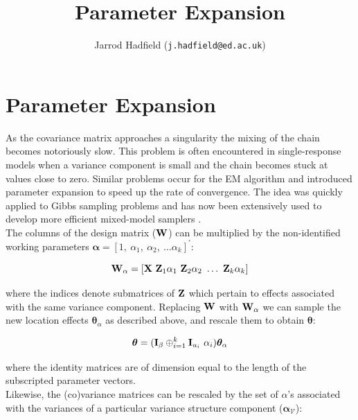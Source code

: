 \documentclass{article}
\title{Parameter Expansion}
\author{Jarrod Hadfield (\texttt{j.hadfield@ed.ac.uk})}
\begin{document}
\maketitle
\else
\chapter{Parameter Expansion}
\label{secPX}
\fi


As the covariance matrix approaches a singularity the mixing of the chain becomes notoriously slow. This problem is often encountered in single-response models when a variance component is small and the chain becomes stuck at values close to zero.  Similar problems occur for the EM algorithm and \citet{Liu.1998} introduced parameter expansion to speed up the rate of convergence. The idea was quickly applied to Gibbs sampling problems \citep{Liu.1999} and has now been extensively used to develop more efficient mixed-model samplers \citep[e.g.][]{vanDyk.2001, Gelman.2008b, Browne.2009}.\\

The columns of the design matrix (${\bf W}$) can be multiplied by the non-identified working parameters ${\bm \alpha} = \left[1,\ \alpha_{1},\ \alpha_{2},\ \dots \alpha_{k}\right]^{'}$:

\begin{equation} 
{\bf W}_{\alpha} = \left[{\bf X}\ {\bf Z}_{1}\alpha_{1}\ {\bf Z}_{2}\alpha_{2}\ \dots\ {\bf Z}_{k}\alpha_{k}\right]
\label{wstar}
\end{equation}

where the indices denote submatrices of ${\bf Z}$ which pertain to effects associated with the same variance component. Replacing  ${\bf W}$ with ${\bf W}_{\alpha}$ we can sample the new location effects  ${\bm \theta}_{\alpha}$ as described above, and rescale them to obtain ${\bm \theta}$:

\begin{equation} 
{\bm \theta} = ({\bf I}_{\beta}\oplus_{i=1}^{k}{\bf I}_{u_{i}}\ \alpha_{i}){\bm \theta}_{\alpha}
\end{equation}

where the identity matrices are of dimension equal to the length of the subscripted parameter vectors.\\ 


Likewise, the (co)variance matrices can be rescaled by the set of $\alpha$'s associated with the variances of a particular variance structure component (${\bm \alpha}_{\mathcal{V}}$):
\end{document}
